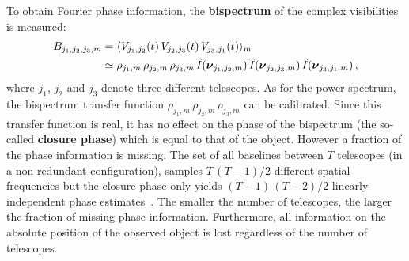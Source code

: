 \documentclass{article}
\newcommand{\vocab}[1]{\textbf{#1}}
\newcommand{\V}[1]{\boldsymbol{#1}}      %
\newcommand{\FT}[1]{\hat{#1}}            %
\newcommand{\avg}[1]{\langle #1\rangle}
\newcommand{\ComplexVis}{V}
\newcommand{\Bispectrum}{B}
\newcommand{\PhaseClosure}{\beta}
\newcommand{\Freq}{\nu}               %
\newcommand{\VFreq}{\V{\Freq}}
\newcommand{\Image}{I}
\newcommand{\GainSquaredModulus}{\rho}
\begin{document}
To obtain Fourier phase information, the \vocab{bispectrum} of the complex
visibilities is measured:
\begin{align}
  \Bispectrum_{j_1,j_2,j_3,m}
  &= \avg{\ComplexVis_{j_1,j_2}(t)\,\ComplexVis_{j_2,j_3}(t)\,
     \ComplexVis_{j_3,j_1}(t)}_m \notag \\
  &\simeq \GainSquaredModulus_{j_1,m} \,
     \GainSquaredModulus_{j_2,m} \,
     \GainSquaredModulus_{j_3,m} \,
     \FT{\Image}(\VFreq_{j_1,j_2,m}) \,
     \FT{\Image}(\VFreq_{j_2,j_3,m}) \,
     \FT{\Image}(\VFreq_{j_3,j_1,m}) \, , 
     \label{eq:mean-bispectrum}
\end{align}
where $j_1$, $j_2$ and $j_3$ denote three different telescopes.  As for the
power spectrum, the bispectrum transfer function $\GainSquaredModulus_{j_1,m}
\, \GainSquaredModulus_{j_2,m} \, \GainSquaredModulus_{j_3,m}$ can be
calibrated.  Since this transfer function is real, it has no effect on the
phase of the bispectrum (the so-called \vocab{closure phase}) which is equal to
that of the object.
However a fraction of the phase information is missing.  The set of all
baselines between $T$ telescopes (in a non-redundant configuration), samples
$T\,(T - 1)/2$ different spatial frequencies but the closure phase only yields
$(T - 1)\,(T - 2)/2$ linearly independent phase
estimates~\citep{Monnier-2003-interferometry}.  The smaller the number of
telescopes, the larger the fraction of missing phase information.
Furthermore, all information on the absolute position of the observed object
is lost regardless of the number of telescopes.
\end{document}
